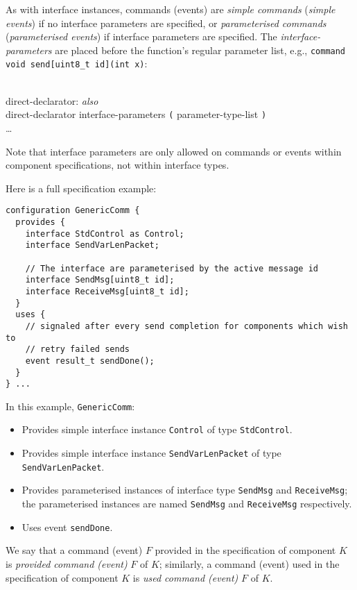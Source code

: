 \documentclass[11pt]{article}
\newcommand{\kw}[1]{{\tt #1}}
\newcommand{\code}[1]{{\tt #1}}
\begin{document}
As with interface instances, commands (events) are \emph{simple commands}
(\emph{simple events}) if no interface parameters are specified, or
\emph{parameterised commands} (\emph{parameterised events}) if interface
parameters are specified. The \emph{interface-parameters} are placed before
the function's regular parameter list, e.g., \code{command void
send[uint8\_t id](int x)}: \em \begin{tabbing}
\hspace*{2cm}\= \\ \kill
direct-declarator: \emph{also}\\
\>	direct-declarator interface-parameters \kw{(} parameter-type-list \kw{)}\\
\>	\ldots
\end{tabbing} \rm
Note that interface parameters are only allowed on commands or events within
component specifications, not within interface types.

Here is a full specification example:
\begin{verbatim}
configuration GenericComm {
  provides {
    interface StdControl as Control;
    interface SendVarLenPacket;
    
    // The interface are parameterised by the active message id
    interface SendMsg[uint8_t id];
    interface ReceiveMsg[uint8_t id];
  }
  uses {
    // signaled after every send completion for components which wish to
    // retry failed sends
    event result_t sendDone();
  }
} ...
\end{verbatim}
In this example, \code{GenericComm}:
\begin{itemize}
\item Provides simple interface instance \code{Control} of type
\code{StdControl}.
\item Provides simple interface instance \code{SendVarLenPacket} of type
\code{SendVarLenPacket}.
\item Provides parameterised instances of interface type \code{SendMsg} and
\code{ReceiveMsg}; the parameterised instances are named \code{SendMsg} and
\code{ReceiveMsg} respectively.
\item Uses event \code{sendDone}.
\end{itemize}

We say that a command (event) $F$ provided in the specification of
component $K$ is \emph{provided command (event)} $F$ of $K$; similarly, a
command (event) used in the specification of component $K$ is \emph{used
command (event)} $F$ of $K$.
\end{document}
